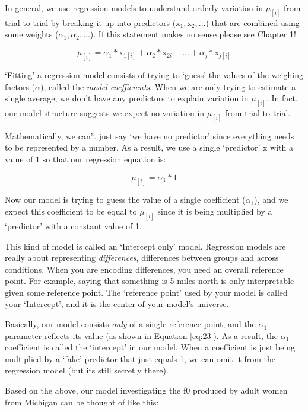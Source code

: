 \documentclass[
]{book}
\begin{document}
In general, we use regression models to understand orderly variation in \(\mu_{[i]}\) from trial to trial by breaking it up into predictors (\(\mathrm{x}_{1}, \mathrm{x}_{2},...\)) that are combined using some weights (\(\alpha_1, \alpha_2,...\)). If this statement makes no sense please see Chapter 1!.

\[
\mu_{[i]} = \alpha_1*\mathrm{x}_{1{[i]}} + \alpha_2*\mathrm{x}_{2i}+...+\alpha_j*\mathrm{x}_{j{[i]}}
\label{eq:22}
\]

`Fitting' a regression model consists of trying to `guess' the values of the weighing factors (\(\alpha\)), called the \emph{model coefficients}. When we are only trying to estimate a single average, we don't have any predictors to explain variation in \(\mu_{[i]}\). In fact, our model structure suggests we expect no variation in \(\mu_{[i]}\) from trial to trial.

Mathematically, we can't just say `we have no predictor' since everything needs to be represented by a number. As a result, we use a single `predictor' \(\mathrm{x}\) with a value of 1 so that our regression equation is:

\[
\mu_{[i]} = \alpha_1*1
\label{eq:23}
\]

Now our model is trying to guess the value of a single coefficient (\(\alpha_1\)), and we expect this coefficient to be equal to \(\mu_{[i]}\) since it is being multiplied by a `predictor' with a constant value of 1.

This kind of model is called an `Intercept only' model. Regression models are really about representing \emph{differences}, differences between groups and across conditions. When you are encoding differences, you need an overall reference point. For example, saying that something is 5 miles north is only interpretable given some reference point. The `reference point' used by your model is called your `Intercept', and it is the center of your model's universe.

Basically, our model consists \emph{only} of a single reference point, and the \(\alpha_1\) parameter reflects its value (as shown in Equation \eqref{eq:23}). As a result, the \(\alpha_1\) coefficient is called the `intercept' in our model. When a coefficient is just being multiplied by a `fake' predictor that just equals 1, we can omit it from the regression model (but its still secretly there).

Based on the above, our model investigating the f0 produced by adult women from Michigan can be thought of like this:
\end{document}
